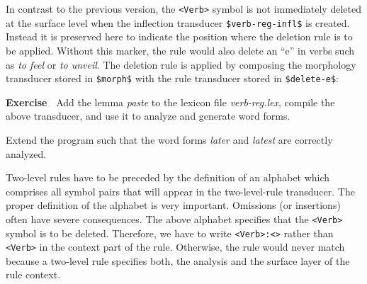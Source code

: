 \documentclass[11pt]{article}
\newenvironment{exercise}{

  \hrulefill\nopagebreak

  \textbf{Exercise~}}
{

  \nopagebreak\hrulefill\vspace{0.2cm}

}
\begin{document}
In contrast to the previous version, the \verb#<Verb># symbol is not
immediately deleted at the surface level when the inflection
transducer \verb#$verb-reg-infl$# is created. Instead it is preserved
here to indicate the position where the deletion rule is to be
applied. Without this marker, the rule would also delete an ``e'' in
verbs such as \emph{to feel} or \emph{to unveil}.  The deletion rule
is applied by composing the morphology transducer stored in
\verb#$morph$# with the rule transducer stored in \verb#$delete-e$#:

\begin{exercise}
  Add the lemma \emph{paste} to the lexicon file \emph{verb-reg.lex},
  compile the above transducer, and use it to analyze and generate
  word forms.
  
  Extend the program such that the word forms \emph{later} and
  \emph{latest} are correctly analyzed.
\end{exercise}

Two-level rules have to be preceded by the definition of an alphabet
which comprises all symbol pairs that will appear in the
two-level-rule transducer. The proper definition of the alphabet is
very important. Omissions (or insertions) often have severe
consequences. The above alphabet specifies that the \verb#<Verb>#
symbol is to be deleted. Therefore, we have to write \verb#<Verb>:<>#
rather than \verb#<Verb># in the context part of the rule. Otherwise,
the rule would never match because a two-level rule specifies both,
the analysis and the surface layer of the rule context.
\end{document}

